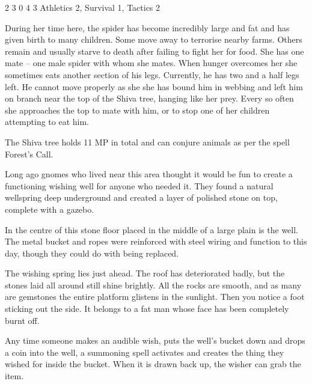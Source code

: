 \begin{multicols}{2}
{2}%
{3}%
{0}%
{4}%
{3}%
{Athletics 2, Survival 1, Tactics 2}%
{\web}%
{}

During her time here, the spider has become incredibly large and fat and has given birth to many children.
Some move away to terrorise nearby farms.
Others remain and usually starve to death after failing to fight her for food.
She has one mate -- one male spider with whom she mates.
When hunger overcomes her she sometimes eats another section of his legs.
Currently, he has two and a half legs left.
He cannot move properly as she she has bound him in webbing and left him on branch near the top of the Shiva tree, hanging like her prey.
Every so often she approaches the top to mate with him, or to stop one of her children attempting to eat him.


\nuraspider

The Shiva tree holds 11 MP in total and can conjure animals as per the spell Forest's Call.


Long ago gnomes who lived near this area thought it would be fun to create a functioning wishing well for anyone who needed it.
They found a natural wellspring deep underground and created a layer of polished stone on top, complete with a gazebo.

In the centre of this stone floor placed in the middle of a large plain is the well.
The metal bucket and ropes were reinforced with steel wiring and function to this day, though they could do with being replaced.

\begin{boxtext}

	The wishing spring lies just ahead.
	The roof has deteriorated badly, but the stones laid all around still shine brightly.
	All the rocks are smooth, and as many are gemstones the entire platform glistens in the sunlight.
	Then you notice a foot sticking out the side.
	It belongs to a fat man whose face has been completely burnt off.

\end{boxtext}

Any time someone makes an audible wish, puts the well's bucket down and drops a coin into the well, a summoning spell activates and creates the thing they wished for inside the bucket.
When it is drawn back up, the wisher can grab the item.


\end{multicols}

